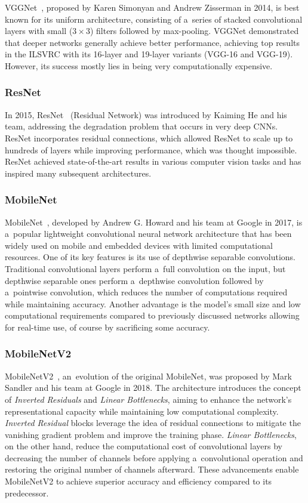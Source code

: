 VGGNet~\cite{Simonyan2014}, proposed by Karen Simonyan and Andrew Zisserman in
2014, is best known for its uniform architecture, consisting of a~series of
stacked convolutional layers with small ($3 \times 3$) filters followed by
max-pooling.  VGGNet demonstrated that deeper networks generally achieve better
performance, achieving top results in the ILSVRC with its 16-layer and 19-layer
variants (VGG-16 and VGG-19). However, its success mostly lies in being very
computationally expensive.


\subsubsection{ResNet}

In 2015, ResNet~\cite{He2015} (Residual Network) was introduced by Kaiming He
and his team, addressing the degradation problem that occurs in very deep CNNs.
ResNet incorporates residual connections, which allowed ResNet to scale up to
hundreds of layers while improving performance, which was thought impossible.
ResNet achieved state-of-the-art results in various computer vision tasks and
has inspired many subsequent architectures.


\subsubsection{MobileNet}

MobileNet~\cite{Howard2017}, developed by Andrew G. Howard and his team at
Google in 2017, is a~popular lightweight convolutional neural network
architecture that has been widely used on mobile and embedded devices with
limited computational resources. One of its key features is its use of depthwise
separable convolutions. Traditional convolutional layers perform a~full
convolution on the input, but depthwise separable ones perform a~depthwise
convolution followed by a~pointwise convolution, which reduces the number of
computations required while maintaining accuracy. Another advantage is the
model's small size and low computational requirements compared to previously
discussed networks allowing for real-time use, of course by sacrificing some
accuracy.


\subsubsection{MobileNetV2}

MobileNetV2~\cite{Sandler2018}, an~evolution of the original MobileNet, was
proposed by Mark Sandler and his team at Google in 2018. The architecture
introduces the concept of \textit{Inverted Residuals} and \textit{Linear
Bottlenecks}, aiming to enhance the network's representational capacity while
maintaining low computational complexity. \textit{Inverted Residual} blocks
leverage the idea of residual connections to mitigate the vanishing gradient
problem and improve the training phase. \textit{Linear Bottlenecks}, on the
other hand, reduce the computational cost of convolutional layers by decreasing
the number of channels before applying a~convolutional operation and restoring
the original number of channels afterward. These advancements enable MobileNetV2
to achieve superior accuracy and efficiency compared to its predecessor.



